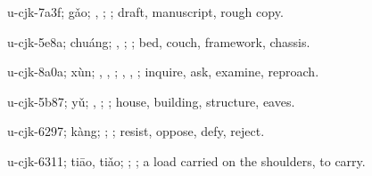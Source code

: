 \begin{multicols}{2}
{\cjkgGlue{}u-cjk-7a3f; gǎo; \cjkgGlue{}, \cjkgGlue{}; \cjkgGlue{}; draft, manuscript, rough copy.

\cjkgGlue{}u-cjk-5e8a; chuáng; \cjkgGlue{}, \cjkgGlue{}; \cjkgGlue{}; bed, couch, framework, chassis.

\cjkgGlue{}u-cjk-8a0a; xùn; \cjkgGlue{}\cjkgGlue{}\cjkgGlue{}, \cjkgGlue{}\cjkgGlue{}\cjkgGlue{}, \cjkgGlue{}\cjkgGlue{}\cjkgGlue{}; \cjkgGlue{}, \cjkgGlue{}, \cjkgGlue{}; inquire, ask, examine, reproach.

\cjkgGlue{}u-cjk-5b87; yǔ; \cjkgGlue{}, \cjkgGlue{}; \cjkgGlue{}; house, building, structure, eaves.

\cjkgGlue{}u-cjk-6297; kàng; \cjkgGlue{}\cjkgGlue{}\cjkgGlue{}; \cjkgGlue{}; resist, oppose, defy, reject.

\cjkgGlue{}u-cjk-6311; tiāo, tiǎo; \cjkgGlue{}\cjkgGlue{}\cjkgGlue{}; \cjkgGlue{}; a load carried on the shoulders, to carry.

}
\end{multicols}
